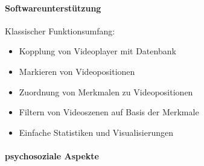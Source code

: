 \paragraph{Softwareunterstützung}
Klassischer Funktionsumfang:
\begin{itemize}
  \item Kopplung von Videoplayer mit Datenbank
  \item Markieren von Videopositionen
  \item Zuordnung von Merkmalen zu Videopositionen
  \item Filtern von Videoszenen auf Basis der Merkmale
  \item Einfache Statistiken und Visualisierungen
\end{itemize}
\paragraph{psychosoziale Aspekte}
